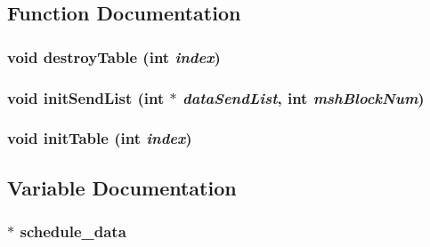 \subsection{Function Documentation}
\hypertarget{register_8H_a099f07ebad307cc1509766f32cfcba5f}{
\subsubsection[{destroyTable}]{\setlength{\rightskip}{0pt plus 5cm}void destroyTable (int {\em index})}}
\label{register_8H_a099f07ebad307cc1509766f32cfcba5f}
\hypertarget{register_8H_a4e113cf30f6198d50fb212074effcc61}{
\subsubsection[{initSendList}]{\setlength{\rightskip}{0pt plus 5cm}void initSendList (int $\ast$ {\em dataSendList}, \/  int {\em mshBlockNum})}}
\label{register_8H_a4e113cf30f6198d50fb212074effcc61}
\hypertarget{register_8H_a14fad51cfceca5a582218c98bdb3d769}{
\subsubsection[{initTable}]{\setlength{\rightskip}{0pt plus 5cm}void initTable (int {\em index})}}
\label{register_8H_a14fad51cfceca5a582218c98bdb3d769}


\subsection{Variable Documentation}
\hypertarget{register_8H_ae191ced1f6c194db9b7dc5c3aed3a5d2}{
\subsubsection[{schedule\_\-data}]{$\ast$ {\bf schedule\_\-data}}}
\label{register_8H_ae191ced1f6c194db9b7dc5c3aed3a5d2}
